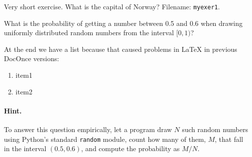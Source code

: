 \documentclass[%
oneside,                 %
final,                   %
10pt]{article}
\newenvironment{doconceexercise}{}{}
\newcounter{doconceexercisecounter}
\theoremstyle{definition}
\begin{document}
\begin{enumerate}
\begin{doconceexercise}

                             
\label{my:exer1}

Very short exercise. What is the capital
of Norway?
\noindent Filename: \texttt{myexer1}.

\end{doconceexercise}

\begin{doconceexercise}

                             
\label{demo:ex:2}


What is the probability of getting a number between 0.5 and 0.6 when
drawing uniformly distributed random numbers from the interval $[0,1)$?

At the end we have a list because that caused problems in {\LaTeX}
in previous DocOnce versions:

\begin{enumerate}
\item item1

\item item2
\end{enumerate}

\noindent

\paragraph{Hint.}
To answer this question empirically, let a program
draw $N$ such random numbers using Python's standard \texttt{random} module,
count how many of them, $M$, that fall in the interval $(0.5,0.6)$, and
compute the probability as $M/N$.


\end{doconceexercise}

\begin{doconceexercise}


\end{doconceexercise}
\end{enumerate}
\end{document}
